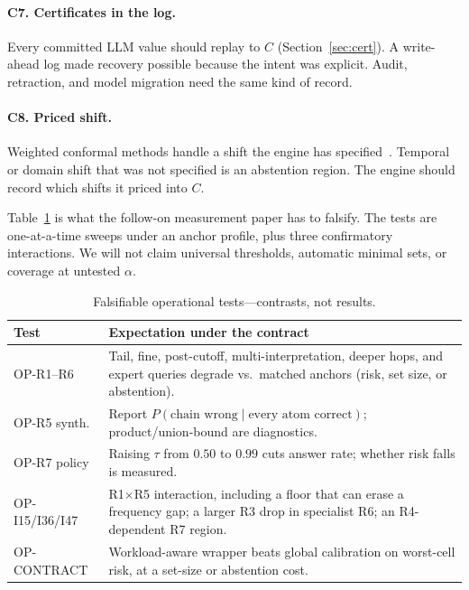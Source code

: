 \documentclass[sigconf, nonacm]{acmart}
\begin{document}
\paragraph{C7. Certificates in the log.}
Every committed LLM value should replay to $C$ (Section~\ref{sec:cert}). A write-ahead log made recovery possible because the intent was explicit. Audit, retraction, and model migration need the same kind of record.

\paragraph{C8. Priced shift.}
Weighted conformal methods handle a shift the engine has specified~\cite{tibshirani2019weighted}. Temporal or domain shift that was not specified is an abstention region. The engine should record which shifts it priced into $C$.

Table~\ref{tab:op} is what the follow-on measurement paper has to falsify. The tests are one-at-a-time sweeps under an anchor profile, plus three confirmatory interactions. We will not claim universal thresholds, automatic minimal sets, or coverage at untested $\alpha$.

\begin{table}[t]
\caption{Falsifiable operational tests---contrasts, not results.}
\label{tab:op}
\scriptsize
\setlength{\tabcolsep}{3pt}
\begin{tabular}{@{}>{\raggedright\arraybackslash}p{}
                >{\raggedright\arraybackslash}p{}@{}}
\toprule
Test & Expectation under the contract \\
\midrule
OP-R1--R6 & Tail, fine, post-cutoff, multi-interpretation, deeper hops, and expert queries degrade vs.\ matched anchors (risk, set size, or abstention). \\
OP-R5 synth. & Report $P(\text{chain wrong}\mid\text{every atom correct})$; product/union-bound are diagnostics. \\
OP-R7 policy & Raising $\tau$ from $0.50$ to $0.99$ cuts answer rate; whether risk falls is measured. \\
OP-I15/I36/I47 & R1$\times$R5 interaction, including a floor that can erase a frequency gap; a larger R3 drop in specialist R6; an R4-dependent R7 region. \\
OP-CONTRACT & Workload-aware wrapper beats global calibration on worst-cell risk, at a set-size or abstention cost. \\
\bottomrule
\end{tabular}
\end{table}
\end{document}
